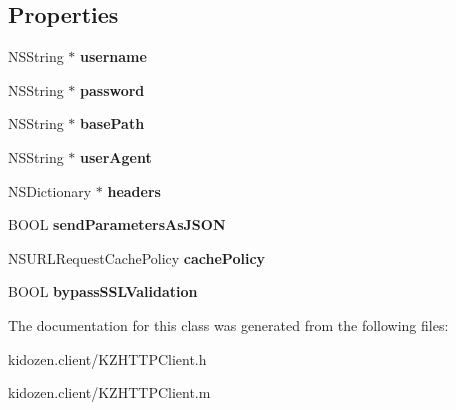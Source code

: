 \subsection*{Properties}
\begin{DoxyCompactItemize}
\item 
\hypertarget{interface_k_z_h_t_t_p_client_a356180745db95800937f6a1cd0fa6c5b}{N\-S\-String $\ast$ {\bfseries username}}\label{interface_k_z_h_t_t_p_client_a356180745db95800937f6a1cd0fa6c5b}

\item 
\hypertarget{interface_k_z_h_t_t_p_client_a15b9953bb762631848c45287fe4debc1}{N\-S\-String $\ast$ {\bfseries password}}\label{interface_k_z_h_t_t_p_client_a15b9953bb762631848c45287fe4debc1}

\item 
\hypertarget{interface_k_z_h_t_t_p_client_a6ce6da02eb7e4e303b0d02f856a46f1f}{N\-S\-String $\ast$ {\bfseries base\-Path}}\label{interface_k_z_h_t_t_p_client_a6ce6da02eb7e4e303b0d02f856a46f1f}

\item 
\hypertarget{interface_k_z_h_t_t_p_client_a1c4cb436dcacb38c19b2e341b66c1beb}{N\-S\-String $\ast$ {\bfseries user\-Agent}}\label{interface_k_z_h_t_t_p_client_a1c4cb436dcacb38c19b2e341b66c1beb}

\item 
\hypertarget{interface_k_z_h_t_t_p_client_a507fe98f4443c7baa41b031206ce96b5}{N\-S\-Dictionary $\ast$ {\bfseries headers}}\label{interface_k_z_h_t_t_p_client_a507fe98f4443c7baa41b031206ce96b5}

\item 
\hypertarget{interface_k_z_h_t_t_p_client_ad406c63c87e5c5371060927cd75fbe70}{B\-O\-O\-L {\bfseries send\-Parameters\-As\-J\-S\-O\-N}}\label{interface_k_z_h_t_t_p_client_ad406c63c87e5c5371060927cd75fbe70}

\item 
\hypertarget{interface_k_z_h_t_t_p_client_a3526073ca439e4c81118063e7c8fa895}{N\-S\-U\-R\-L\-Request\-Cache\-Policy {\bfseries cache\-Policy}}\label{interface_k_z_h_t_t_p_client_a3526073ca439e4c81118063e7c8fa895}

\item 
\hypertarget{interface_k_z_h_t_t_p_client_a291ac94e7623ba44a195afcaa31500fe}{B\-O\-O\-L {\bfseries bypass\-S\-S\-L\-Validation}}\label{interface_k_z_h_t_t_p_client_a291ac94e7623ba44a195afcaa31500fe}

\end{DoxyCompactItemize}


The documentation for this class was generated from the following files\-:\begin{DoxyCompactItemize}
\item 
kidozen.\-client/K\-Z\-H\-T\-T\-P\-Client.\-h\item 
kidozen.\-client/K\-Z\-H\-T\-T\-P\-Client.\-m\end{DoxyCompactItemize}

